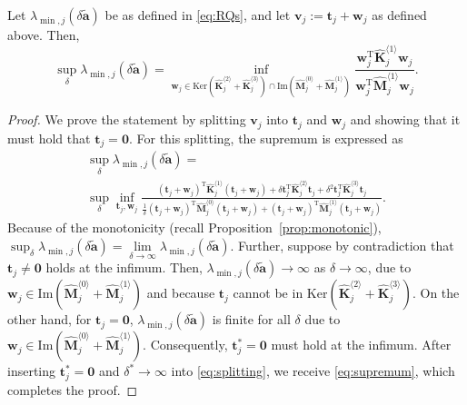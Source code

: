 \documentclass[final,onefignum,onetabnum]{siamart220329}
\newtheorem*{proof}{Proof}%
\begin{document}
\begin{proposition}\label{prop:supremum}
Let $\lambda_{\min,j}(\delta \tilde{\mathbf{a}})$ be as defined in \eqref{eq:RQs}, and let $\mathbf{v}_j := \mathbf{t}_j + \mathbf{w}_j$ as defined above. Then, 
\begin{equation}\label{eq:supremum}
	\sup_{\delta} \lambda_{\min,j}(\delta \tilde{\mathbf{a}}) = \inf_{\mathbf{w}_j \in \mathrm{Ker}\left(\hat{\mathbf{K}}_j^{\langle 2\rangle} + \hat{\mathbf{K}}_j^{\langle 3\rangle}\right) \cap \mathrm{Im}\left(\hat{\mathbf{M}}_j^{\langle 0\rangle} + \hat{\mathbf{M}}_j^{\langle 1\rangle}\right)} \frac{\mathbf{w}_j^\mathrm{T} \hat{\mathbf{K}}_j^{\langle 1\rangle}\mathbf{w}_j}{\mathbf{w}_j^\mathrm{T} \hat{\mathbf{M}}_j^{\langle 1\rangle} \mathbf{w}_j}.
\end{equation}
\begin{proof}
We prove the statement by splitting $\mathbf{v}_j$ into $\mathbf{t}_j$ and $\mathbf{w}_j$ and showing that it must hold that $\mathbf{t}_j=\mathbf{0}$.  For this splitting, the supremum is expressed as
\begin{equation}\label{eq:splitting}
	\begin{multlined}
		\sup_\delta \lambda_{\min,j}(\delta \tilde{\mathbf{a}})= \\
		\sup_\delta \inf\limits_{\mathbf{t}_j, \mathbf{w}_j}
		 \frac{\left(\mathbf{t}_j+\mathbf{w}_j\right)^\mathrm{T} \hat{\mathbf{K}}_j^{\langle 1\rangle}\left(\mathbf{t}_j+\mathbf{w}_j\right) + \delta\mathbf{t}_j^\mathrm{T} \hat{\mathbf{K}}_j^{\langle 2\rangle}\mathbf{t}_j + \delta^2\mathbf{t}_j^\mathrm{T} \hat{\mathbf{K}}_j^{\langle 3\rangle}\mathbf{t}_j }{\frac{1}{\delta}\left(\mathbf{t}_j+\mathbf{w}_j\right)^\mathrm{T} \hat{\mathbf{M}}_j^{\langle 0\rangle} \left(\mathbf{t}_j+\mathbf{w}_j\right) + \left(\mathbf{t}_j+\mathbf{w}_j\right)^\mathrm{T} \hat{\mathbf{M}}_j^{\langle 1\rangle} \left(\mathbf{t}_j+\mathbf{w}_j\right)}.
	\end{multlined}
\end{equation}
%
Because of the monotonicity (recall Proposition~\ref{prop:monotonic}), $\sup_\delta \lambda_{\min,j}(\delta \tilde{\mathbf{a}}) = \lim\limits_{\delta\rightarrow \infty}\lambda_{\min,j}(\delta \tilde{\mathbf{a}})$. Further, suppose by {contradiction} that $\mathbf{t}_j \neq \mathbf{0}$ holds at the infimum. Then, $\lambda_{\min,j}(\delta \tilde{\mathbf{a}}) \rightarrow \infty$ as $\delta \rightarrow \infty$, due to $\mathbf{w}_j \in \mathrm{Im}\left(\hat{\mathbf{M}}_j^{\langle 0\rangle} + \hat{\mathbf{M}}_j^{\langle 1\rangle}\right)$ and because $\mathbf{t}_j$ cannot be in $\mathrm{Ker}\left(\hat{\mathbf{K}}_j^{\langle 2\rangle} + \hat{\mathbf{K}}_j^{\langle 3\rangle}\right)$. On the other hand, for $\mathbf{t}_j = \mathbf{0}$, $\lambda_{\min,j}(\delta \tilde{\mathbf{a}})$ is finite for all $\delta$ due to $\mathbf{w}_j \in \mathrm{Im}\left(\hat{\mathbf{M}}_j^{\langle 0\rangle} + \hat{\mathbf{M}}_j^{\langle 1\rangle}\right)$. Consequently, $\mathbf{t}_j^*=\mathbf{0}$ must hold at the infimum. After inserting $\mathbf{t}_j^*=\mathbf{0}$ and $\delta^*\rightarrow \infty$ into \eqref{eq:splitting}, we receive \eqref{eq:supremum}, which completes the proof.
\end{proof}
\end{proposition}
\end{document}
